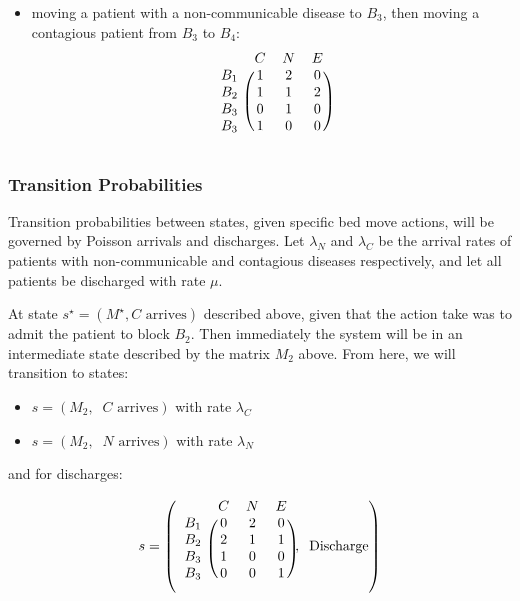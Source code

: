 \documentclass{article}
\begin{document}
\begin{itemize}
  \item moving a patient with a non-communicable disease to $B_3$, then moving a contagious patient from $B_3$ to $B_4$:
  \begin{equation*}
  \begin{blockarray}{cccc}
  & C & N & E \\
  \begin{block}{c(ccc)}
  B_1 & 1 & 2 & 0 \\
  B_2 & 1 & 1 & 2 \\
  B_3 & 0 & 1 & 0 \\
  B_3 & 1 & 0 & 0 \\
  \end{block}
  \end{blockarray}
  \end{equation*}

\end{itemize}

\subsubsection*{Transition Probabilities}
Transition probabilities between states, given specific bed move actions, will be governed by Poisson arrivals and discharges.
Let $\lambda_N$ and $\lambda_C$ be the arrival rates of patients with non-communicable and contagious diseases respectively, and let all patients be discharged with rate $\mu$.

At state $s^{\star} = (M^{\star}, C \text{ arrives})$ described above, given that the action take was to admit the patient to block $B_2$.
Then immediately the system will be in an intermediate state described by the matrix $M_2$ above.
From here, we will transition to states:

\begin{itemize}
  \item $s = (M_2, \;\; C \text{ arrives})$ with rate $\lambda_C$
  \item $s = (M_2, \;\; N \text{ arrives})$ with rate $\lambda_N$
\end{itemize}

and for discharges:

\begin{equation*}
s = \left(
\begin{blockarray}{cccc}
& C & N & E \\
\begin{block}{c(ccc)}
B_1 & 0 & 2 & 0 \\
B_2 & 2 & 1 & 1 \\
B_3 & 1 & 0 & 0 \\
B_3 & 0 & 0 & 1 \\
\end{block}
\end{blockarray}, \;\; \text{Discharge} \right)
\end{equation*}
\end{document}
